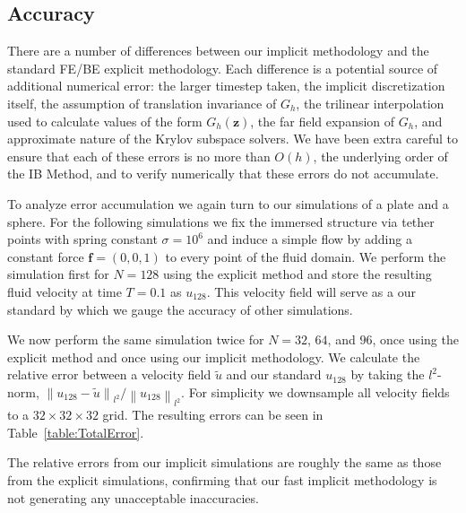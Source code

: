 \documentclass[preprint,12pt]{elsarticle}
\newcommand{\norm}[1]{\left\lVert#1\right\rVert}
\newcommand{\B}[1]{\mathbf{#1}}
\begin{document}
\subsection{Accuracy}
There are a number of differences between our implicit methodology and the standard FE/BE explicit methodology. Each difference is a potential source of additional numerical error: the larger timestep taken, the implicit discretization itself, the assumption of translation invariance of $G_h$, the trilinear interpolation used to calculate values of the form $G_h(\B{z})$, the far field expansion of $G_h$, and approximate nature of  the Krylov subspace solvers. We have been extra careful to ensure that each of these errors is 
 no more than $O(h)$, the underlying order of the IB Method, and to verify numerically that these errors do not accumulate. 
 
To analyze error accumulation we again turn to our simulations of a plate and a sphere. For the following simulations we fix the immersed structure via tether points with spring constant $\sigma=10^6$ and induce a simple flow by adding a constant force $\B{f} = (0,0,1)$ to every point of the fluid domain. We perform the simulation first for $N=128$ using the explicit method and store the resulting fluid velocity at time $T=0.1$ as $u_{128}$. This velocity field will serve as a our standard by which we gauge the accuracy of other simulations.

We now perform the same simulation twice for $N=32$, $64$, and $96$, once using the explicit method and once using our implicit methodology. We calculate the relative error between a velocity field $\tilde{u}$ and our standard $u_{128}$ by taking the $l^2$-norm, $\norm{u_{128} - \tilde{u}}_{l^2} / \norm{u_{128}}_{l^2}$. For simplicity we downsample all velocity fields to a $32\times 32\times 32$ grid. The resulting errors can be seen in Table~\ref{table:TotalError}.

The relative errors from our implicit simulations are roughly the same as those from the explicit simulations, confirming that our fast implicit methodology is not generating any unacceptable inaccuracies.
\end{document}
